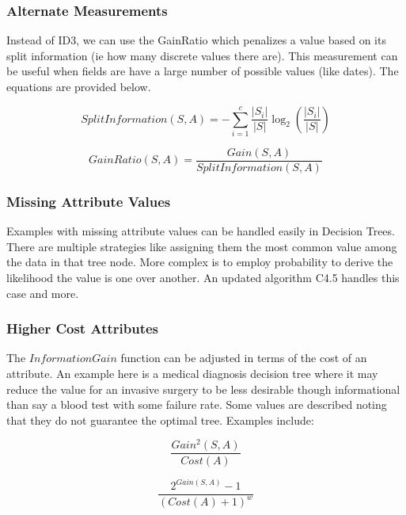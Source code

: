 \documentclass[titlepage,11pt]{article}
\begin{document}
\subsubsection*{Alternate Measurements}

Instead of ID3, we can use the GainRatio which penalizes a value based on its split information (ie how many discrete values there are). This measurement can be useful when fields are have a large number of possible values (like dates). The equations are provided below.

\begin{equation}
SplitInformation(S,A) = -\sum_{i=1}^{c} \frac{|S_i|}{|S|} \log_2(\frac{|S_i|}{|S|})
\end{equation}

\begin{equation}
GainRatio(S,A) = \frac{Gain(S, A)}{SplitInformation(S, A)}
\end{equation}

\subsubsection*{Missing Attribute Values}

Examples with missing attribute values can be handled easily in Decision Trees. There are multiple strategies like assigning them the most common value among the data in that tree node. More complex is to employ probability to derive the likelihood the value is one over another. An updated algorithm C4.5 handles this case and more.

\subsubsection*{Higher Cost Attributes}

The $InformationGain$ function can be adjusted in terms of the cost of an attribute. An example here is a medical diagnosis decision tree where it may reduce the value for an invasive surgery to be less desirable though informational than say a blood test with some failure rate. Some values are described noting that they do not guarantee the optimal tree. Examples include:

\begin{equation}
\frac{Gain^2(S, A)}{Cost(A)}
\end{equation}

\begin{equation}
\frac{2^{Gain(S, A)} - 1}{(Cost(A) + 1)^w}
\end{equation}
\end{document}
